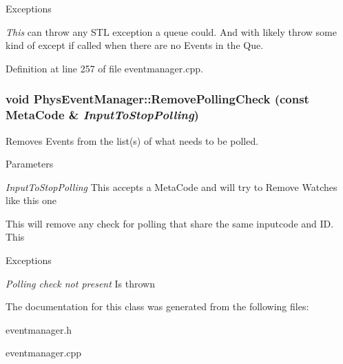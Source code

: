 \begin{DoxyExceptions}{Exceptions}
\item[{\em This}]can throw any STL exception a queue could. And with likely throw some kind of except if called when there are no Events in the Que. \end{DoxyExceptions}


Definition at line 257 of file eventmanager.cpp.

\hypertarget{classPhysEventManager_af81bf9a5f081f44a6cd91fdd19d4a42a}{
\subsubsection[{RemovePollingCheck}]{\setlength{\rightskip}{0pt plus 5cm}void PhysEventManager::RemovePollingCheck (const {\bf MetaCode} \& {\em InputToStopPolling})}}
\label{d5/dd7/classPhysEventManager_af81bf9a5f081f44a6cd91fdd19d4a42a}


Removes Events from the list(s) of what needs to be polled. 


\begin{DoxyParams}{Parameters}
\item[{\em InputToStopPolling}]This accepts a MetaCode and will try to Remove Watches like this one\end{DoxyParams}
This will remove any check for polling that share the same inputcode and ID. This 
\begin{DoxyExceptions}{Exceptions}
\item[{\em Polling check not present}]Is thrown \end{DoxyExceptions}


The documentation for this class was generated from the following files:\begin{DoxyCompactItemize}
\item 
eventmanager.h\item 
eventmanager.cpp\end{DoxyCompactItemize}
